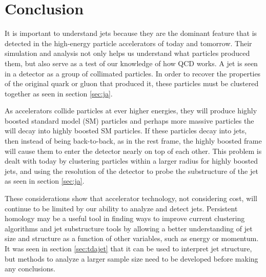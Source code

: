 \documentclass[a4paper,12pt]{report}
\begin{document}
\section{Conclusion}\label{sec:conclusion}

 It is important to understand jets because they are the dominant feature that is detected in the high-energy particle accelerators of today and tomorrow. Their simulation and analysis not only helps us understand what particles produced them, but also serve as a test of our knowledge of how QCD works. A jet is seen in a detector as a group of collimated particles. In order to recover the properties of the original quark or gluon that produced it, these particles must be clustered together as seen in section \ref{sec:ja}. 
 
%  
 
 As accelerators collide particles at ever higher energies, they will produce highly boosted standard model (SM) particles and perhaps more massive particles the will decay into highly boosted SM particles. If these particles decay into jets, then instead of being back-to-back, as in the rest frame, the highly boosted frame will cause them to enter the detector nearly on top of each other. This problem is dealt with today by clustering particles within a larger radius for highly boosted jets, and using the resolution of the detector to probe the substructure of the jet as seen in section \ref{sec:ja}.
 
 These considerations show that accelerator technology, not considering cost, will continue to be limited by our ability to analyze and detect jets. Persistent homology may be a useful tool in finding ways to improve current clustering algorithms and jet substructure tools by allowing a better understanding of jet size and structure as a function of other variables, such as energy or momentum. It was seen in section \ref{sec:tdajet} that it can be used to interpret jet structure, but methods to analyze a larger sample size need to be developed before making any conclusions.
 
\nocite{*}


\end{document}

